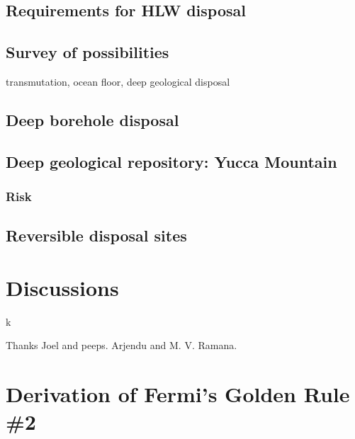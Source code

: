 \documentclass[nofootinbib,preprint,aip,pra]{revtex4-1}
\begin{document}
    \subsection{Requirements for HLW disposal}
    \subsection{Survey of possibilities}
    transmutation, ocean floor, deep geological disposal
    \subsection{Deep borehole disposal}
        \subsection{Deep geological repository: Yucca Mountain}
        \subsubsection{Risk}
    \subsection{Reversible disposal sites}

\section{Discussions}

k
\begin{acknowledgments}
Thanks Joel and peeps. Arjendu and M. V. Ramana.
\end{acknowledgments}

\pagebreak


\appendix
\section{Derivation of Fermi's Golden Rule \#2}
\label{a:fermi}
\end{document}
